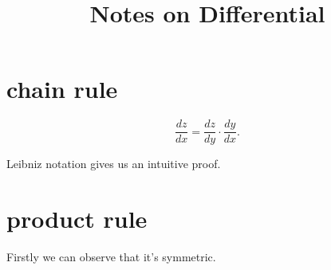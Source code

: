 \documentclass{article}
\title{Notes on Differential}
\begin{document}
\maketitle
\section{chain rule}

\begin{equation}
    \frac{dz}{dx} = \frac{dz}{dy} \cdot \frac{dy}{dx}.
\end{equation}

Leibniz notation gives us an intuitive proof.


\section{product rule}
Firstly we can observe that it's symmetric.
\end{document}
